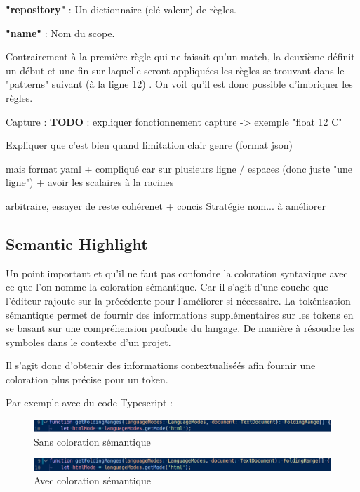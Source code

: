 \documentclass[
    iict, %
    il, %
]{heig-tb}
\begin{document}
\textbf{"repository"} : Un dictionnaire (clé-valeur) de règles.

\textbf{"name"} : Nom du scope.

Contrairement à la première règle qui ne faisait qu'un match, la deuxième définit un début et une fin sur laquelle seront appliquées les règles se trouvant dans le "patterns" suivant (à la ligne 12) . On voit qu'il est donc possible d'imbriquer les règles.

Capture : \textbf{TODO} : expliquer fonctionnement capture -> exemple "float 12 C"

Expliquer que c'est bien quand limitation clair genre {} (format json)

mais format yaml + compliqué car sur plusieurs ligne / espaces (donc juste "une ligne")
+ avoir les scalaires à la racines

arbitraire, essayer de reste cohérenet + concis
Stratégie nom... à améliorer

\subsection{Semantic Highlight}

Un point important et qu'il ne faut pas confondre la coloration syntaxique avec ce que l'on nomme la coloration sémantique. Car il s'agit d'une couche que l'éditeur rajoute sur la précédente pour l'améliorer si nécessaire.
La tokénisation sémantique permet de fournir des informations supplémentaires sur les tokens en se basant sur une compréhension profonde du langage.
De manière à résoudre les symboles dans le contexte d'un projet.

Il s'agit donc d'obtenir des informations contextualiséés afin fournir une coloration plus précise pour un token.

Par exemple avec du code Typescript :

\begin{figure}[!h]
    \begin{center}
        \includegraphics[width=15cm]{assets/figures/semantic-coloration-without.png}
    \end{center}
    \caption[Sans coloration sémantique]{\label{semantic-coloration-without} Sans coloration sémantique}
\end{figure}

\begin{figure}[!h]
    \begin{center}
        \includegraphics[width=15cm]{assets/figures/semantic-coloration-with.png}
    \end{center}
    \caption[Sans coloration sémantique ]{\label{semantic-coloration-with} Avec coloration sémantique }
\end{figure}
\end{document}
